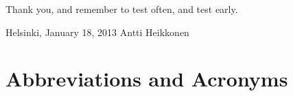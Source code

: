 \documentclass[12pt,a4paper,oneside,pdftex]{report}
\newcommand{\DATE}{January 18, 2013}
\newcommand{\AUTHOR}{Antti Heikkonen}
\begin{document}
Thank you, and remember to test often, and test early.
\vskip 10mm

\noindent Helsinki, \DATE
\vskip 5mm
\noindent\AUTHOR

\cleardoublepage
% 

\chapter*{Abbreviations and Acronyms}


\noindent
\end{document}
